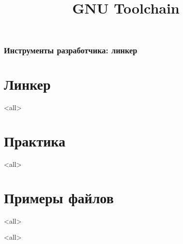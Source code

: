 
\title[toolchain]{GNU Toolchain}




\begin{frame}
	\frametitle{Инструменты разработчика: линкер}
	\titlepage
	\vspace{-0.5cm}
	\begin{center}
	\end{center}
\end{frame}

\begin{frame}
	\tableofcontents
\end{frame}



\section{Линкер}

\mode<all>{}

\section[example]{Практика}

\mode<all>{}

\section[example]{Примеры файлов}

\mode<all>{}

\mode<all>

